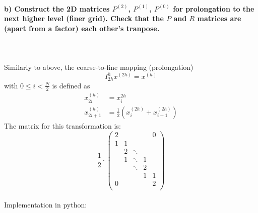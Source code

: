 \newpage
\paragraph{
    b) Construct the 2D matrices $P^{(2)}$, $P^{(1)}$, $P^{(0)}$
    for
    prolongation to the next higher level (finer grid). Check that
    the $P$ and $R$ matrices are (apart from a factor) each other’s
    tranpose.
} \ \\
    \\
    Similarly to above, the coarse-to-fine mapping (prolongation)
    \begin{equation}
        I_{2h}^h x^{(2h)}=x^{(h)}
    \end{equation}
    with $0\leq i<\frac{N}{2}$ is defined as
    \begin{align}
            x_{2i}^{(h)}
            &=x_i^{2h} \\
            x_{2i+1}^{(h)}
            &=\frac{1}{2}(x_i^{(2h)}+x_{i+1}^{(2h)})
    \end{align}
    The matrix for this transformation is:
    \begin{equation}
        \frac{1}{2}\cdot
        \begin{pmatrix}
            2      &   &        &   & 0 \\
            1      & 1 &        &   &        \\
                   & 2 & \ddots &   &        \\
                   & 1 & \ddots & 1 &        \\
                   &   & \ddots & 2 &        \\
                   &   &        & 1 & 1      \\
            0      &   &        &   & 2      \\

        \end{pmatrix}
    \end{equation} \ \\
    Implementation in python:
    


